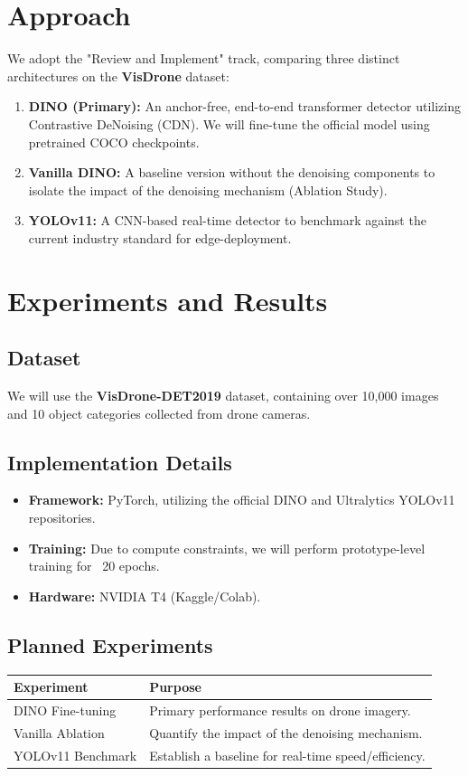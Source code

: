 \documentclass[12pt,a4paper]{article}
\begin{document}
\section{Approach}
We adopt the "Review and Implement" track, comparing three distinct architectures on the \textbf{VisDrone} dataset:
\begin{enumerate}
    \item \textbf{DINO (Primary):} An anchor-free, end-to-end transformer detector utilizing Contrastive DeNoising (CDN). We will fine-tune the official model using pretrained COCO checkpoints.
    \item \textbf{Vanilla DINO:} A baseline version without the denoising components to isolate the impact of the denoising mechanism (Ablation Study).
    \item \textbf{YOLOv11:} A CNN-based real-time detector to benchmark against the current industry standard for edge-deployment.
\end{enumerate}

\section{Experiments and Results}
\subsection{Dataset}
We will use the \textbf{VisDrone-DET2019} dataset, containing over 10,000 images and 10 object categories collected from drone cameras.

\subsection{Implementation Details}
\begin{itemize}
    \item \textbf{Framework:} PyTorch, utilizing the official DINO and Ultralytics YOLOv11 repositories.
    \item \textbf{Training:} Due to compute constraints, we will perform prototype-level training for ~20 epochs.
    \item \textbf{Hardware:} NVIDIA T4 (Kaggle/Colab).
\end{itemize}

\subsection{Planned Experiments}
\begin{table}[h]
\centering
\begin{tabular}{lp{9cm}}
\toprule
\textbf{Experiment} & \textbf{Purpose} \\ \midrule
DINO Fine-tuning & Primary performance results on drone imagery. \\
Vanilla Ablation & Quantify the impact of the denoising mechanism. \\
YOLOv11 Benchmark & Establish a baseline for real-time speed/efficiency. \\ \bottomrule
\end{tabular}
\end{table}
\end{document}
